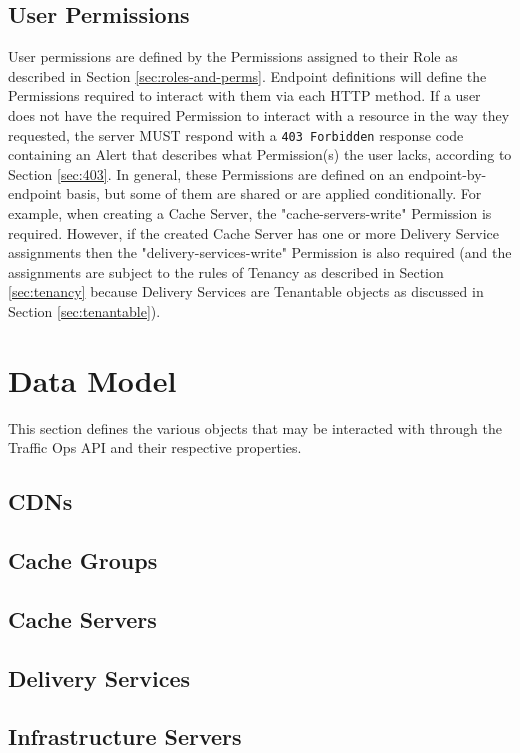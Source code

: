 \documentclass{article}
\newcommand{\code}[1]{\texttt{\color{inlinecodecolor}#1}}
\begin{document}
\subsection{User Permissions}
User permissions are defined by the Permissions assigned to their Role as described in Section \ref{sec:roles-and-perms}. Endpoint definitions
will define the Permissions required to interact with them via each HTTP method. If a user does not have the required Permission to interact
with a resource in the way they requested, the server MUST respond with a \code{403 Forbidden} response code containing an Alert that describes
what Permission(s) the user lacks, according to Section \ref{sec:403}. In general, these Permissions are defined on an endpoint-by-endpoint basis,
but some of them are shared or are applied conditionally. For example, when creating a Cache Server, the "cache-servers-write" Permission is
required. However, if the created Cache Server has one or more Delivery Service assignments then the "delivery-services-write" Permission is also
required (and the assignments are subject to the rules of Tenancy as described in Section \ref{sec:tenancy} because Delivery Services are
Tenantable objects as discussed in Section \ref{sec:tenantable}).

\section{Data Model\label{sec:data-model}}
This section defines the various objects that may be interacted with through the Traffic Ops API and their respective properties.

\subsection{CDNs}

\subsection{Cache Groups}

\subsection{Cache Servers}

\subsection{Delivery Services}

\subsection{Infrastructure Servers}
\end{document}
